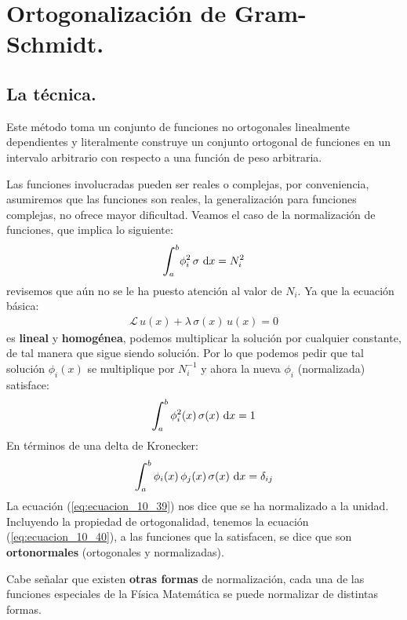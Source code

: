 \documentclass[12pt]{article}
\def\scaleint#1{\vcenter{\hbox{\scaleto[3ex]{\displaystyle\int}{#1}}}}
\def\bs{\mkern-12mu}
\numberwithin{equation}{section}
\begin{document}
\section{Ortogonalización de Gram-Schmidt.}
\subsection{La técnica.}

Este método toma un conjunto de funciones no ortogonales linealmente dependientes y literalmente construye un conjunto ortogonal de funciones en un intervalo arbitrario con respecto a una función de peso arbitraria.
\par
Las funciones involucradas pueden ser reales o complejas, por conveniencia, asumiremos que las funciones son reales, la generalización para funciones complejas, no ofrece mayor dificultad. Veamos el caso de la normalización de funciones, que implica lo siguiente:
\begin{align*}
\scaleint{6ex}_{\bs a}^{b} \phi_{i}^{2} \, \sigma  \, \dd{x}  =  N_{i}^{2}
\end{align*}
revisemos que aún no se le ha puesto atención al valor de $N_{i}$. Ya que la ecuación básica:
\begin{align}
\mathcal{L} \, u (x) + \lambda \, \sigma (x) \, u (x) = 0
\label{eq:ecuacion_10_08}
\end{align}
es \textbf{lineal} y \textbf{homogénea}, podemos multiplicar la solución por cualquier constante, de tal manera que sigue siendo solución. Por lo que podemos pedir que tal solución $\phi_{i}(x)$ se multiplique por $N_{i}^{-1}$  y ahora la nueva $\phi_{i}$ (normalizada) satisface:
\begin{align}
\scaleint{6ex}_{\bs a}^{b} \, \phi_{i}^{2} (x) \, \sigma(x) \, \dd{x} = 1
\label{eq:ecuacion_10_39}
\end{align}
En términos de una delta de Kronecker:
\begin{align}
\scaleint{6ex}_{\bs a}^{b} \, \phi_{i}(x) \, \phi_{j} (x) \, \sigma (x) \, \dd{x} = \delta_{ij}
\label{eq:ecuacion_10_40}
\end{align}
La ecuación (\ref{eq:ecuacion_10_39}) nos dice que se ha normalizado a la unidad. Incluyendo la propiedad de ortogonalidad, tenemos la ecuación (\ref{eq:ecuacion_10_40}), a las funciones que la satisfacen, se dice que son \textbf{ortonormales} (ortogonales y normalizadas).
\par
Cabe señalar que existen \textbf{otras formas} de normalización,  cada una de las funciones especiales de la Física Matemática se puede normalizar de distintas formas.
\end{document}
